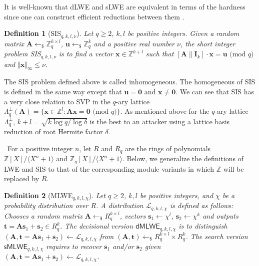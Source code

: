 \documentclass[conference]{IEEEtran}
\newtheorem{definition}{Definition}[section]
\begin{document}
	It is well-known that \textsf{dLWE} and \textsf{sLWE} are equivalent in terms of the hardness since one can construct efficient reductions between them  \cite{Reg09}.
	
	\begin{definition}[\textsf{SIS$_{q,k, l,\nu}$}] \label{def3}
		Let $q \geq 2$, $k, l$ be positive integers. Given a random matrix $\mathbf{A} \leftarrow_{\$} \mathbb{Z}_q^{k \times l}$, $\mathbf{u} \leftarrow_{\$} \mathbb{Z}_q^{k}$ and a positive real number $\nu$, the short integer problem \textsf{SIS$_{q,k,l, \nu}$} is to find a vector $\mathbf{x}\in \mathbb{Z}^{k+l}$ such that $[\mathbf{A}\|\mathbf{I}_k]\cdot\mathbf{x} =\mathbf{u} \text{ (mod } q)$ and $\Vert \mathbf{x}\Vert_{\infty} \leq \nu.$
	\end{definition}
	
	The \textsf{SIS} problem defined above is called inhomogeneous. The homogeneous of \textsf{SIS} is defined in the same way except that $\mathbf{u}=\mathbf{0}$ and $\mathbf{x}\neq \mathbf{0}$.  We can see that \textsf{SIS} has a very close relation to \textsf{SVP}  in the $q$-ary lattice  $\Lambda_q^{\bot}(\mathbf{A})=\{\mathbf{x} \in \mathbb{Z}^l: \mathbf{A}\mathbf{x}=\mathbf{0} \text{ (mod } q) \}.$ 
	As mentioned above for the $q$-ary lattice $\Lambda_q^{\bot}$, $k+l=\sqrt{k\log q/\log \delta}$ is the best to an attacker using a lattice basis reduction of root Hermite factor $\delta$.
	
	\
	For a positive integer $n$, let $R$ and $R_q$ are the rings of polynomials $\mathbb{Z}[X]/ \langle X^n+1 \rangle$ and $\mathbb{Z}_q[X]/ \langle X^n+1 \rangle$. Below, we generalize the definitions of \textsf{LWE} and \textsf{SIS} to that of the corresponding module variants in which $\mathbb{Z}$ will be replaced by $R$.
	
	\fi
	\begin{definition}[\textsf{MLWE$_{q,k,l,\chi}$}] \label{def2}
		Let $q \geq 2$, $k, l$ be positive integers, and $\chi $ be a probability distribution over $R$. A distribution $\mathcal{L}_{q,k,l, \chi}$ is defined as follows: Chooses a random matrix $\mathbf{A} \leftarrow_{\$} R_q^{k \times l}$, vectors $\mathbf{s}_1 \leftarrow \chi^{l}$, $\mathbf{s}_2 \leftarrow \chi^{k}$ and outputs $\mathbf{t}=\mathbf{A}\mathbf{s}_1+\mathbf{s}_2 \in R_q^{k}$. The decisional version $\mathsf{dMLWE}_{q,k,l,\chi}$ is to distinguish $(\mathbf{A}, \mathbf{t}=\mathbf{A}\mathbf{s}_1+\mathbf{s}_2) \leftarrow \mathcal{L}_{q,k,l, \chi}$ from $(\mathbf{A}, \mathbf{t})  \leftarrow_{\$} R_q^{k \times l}\times  R_q^{k}$.  The search version $\mathsf{sMLWE}_{q,k,l,\chi}$ requires to recover $\mathbf{s}_1$ and/or $\mathbf{s}_2$ given $(\mathbf{A}, \mathbf{t}=\mathbf{A}\mathbf{s}_1+\mathbf{s}_2) \leftarrow \mathcal{L}_{q,k,l, \chi}$. 
	\end{definition}
	
\end{document}

